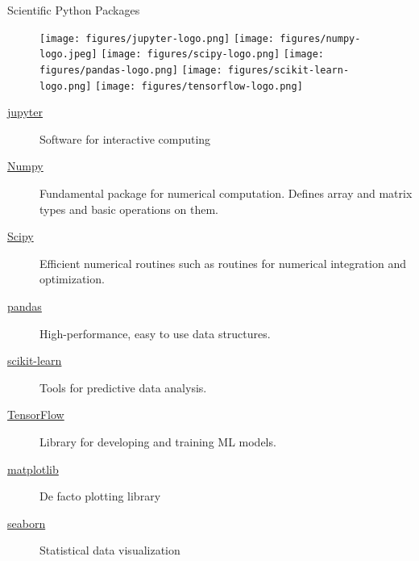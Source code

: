 \documentclass[aspectratio=169]{beamer}
\begin{document}
    \begin{frame}{Scientific Python Packages}
        \begin{figure}
            \centering
            \texttt{[image: figures/jupyter-logo.png]}
            \texttt{[image: figures/numpy-logo.jpeg]}
            \texttt{[image: figures/scipy-logo.png]}
            \texttt{[image: figures/pandas-logo.png]}
            \texttt{[image: figures/scikit-learn-logo.png]}
            \texttt{[image: figures/tensorflow-logo.png]}
        \end{figure}
        \begin{description}
            \item[\href{http://jupyter.org/}{jupyter}] Software for interactive computing
            \item[\href{http://www.scipy.org/}{Numpy}] Fundamental package for numerical computation. Defines array and matrix types and basic operations on them.
            \item[\href{http://www.scipy.org/}{Scipy}] Efficient numerical routines such as routines for numerical integration and optimization.
            \item[\href{http://pandas.pydata.org/}{pandas}] High-performance, easy to use data structures.
            \item[\href{http://scikit-learn.org/}{scikit-learn}] Tools for predictive data analysis.
            \item[\href{http://www.tensorflow.org/}{TensorFlow}] Library for developing and training ML models.
            \item[\href{http://matplotlib.org/}{matplotlib}] De facto plotting library
            \item[\href{http://seaborn.pydata.org/}{seaborn}] Statistical data visualization
        \end{description}
    \end{frame}
\end{document}

